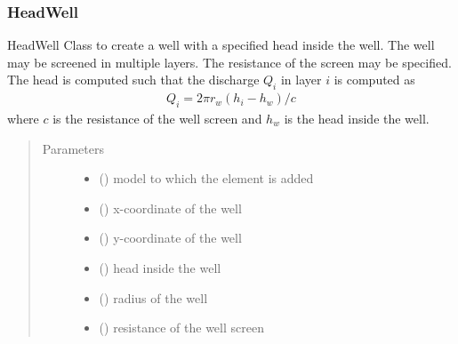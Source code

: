 \documentclass[letterpaper,10pt,english]{sphinxmanual}
\begin{document}
\subsubsection{HeadWell}
\label{\detokenize{wells/headwell::doc}}\label{\detokenize{wells/headwell:headwell}}

\begin{fulllineitems}
\label{\detokenize{wells/headwell:timml.well.HeadWell}}
HeadWell Class to create a well with a specified head inside the well.
The well may be screened in multiple layers. The resistance of the screen
may be specified. The head is computed such that the discharge \(Q_i\)
in layer \(i\) is computed as
\begin{equation*}
\begin{split}Q_i = 2\pi r_w(h_i - h_w)/c\end{split}
\end{equation*}
where \(c\) is the resistance of the well screen and \(h_w\) is
the head inside the well.
\begin{quote}\begin{description}
\item[{Parameters}] \leavevmode\begin{itemize}
\item {} 
 () \textendash{} model to which the element is added

\item {} 
 () \textendash{} x-coordinate of the well

\item {} 
 () \textendash{} y-coordinate of the well

\item {} 
 () \textendash{} head inside the well

\item {} 
 () \textendash{} radius of the well

\item {} 
 () \textendash{} resistance of the well screen


\end{itemize}
\end{description}
\end{quote}
\end{fulllineitems}
\end{document}
